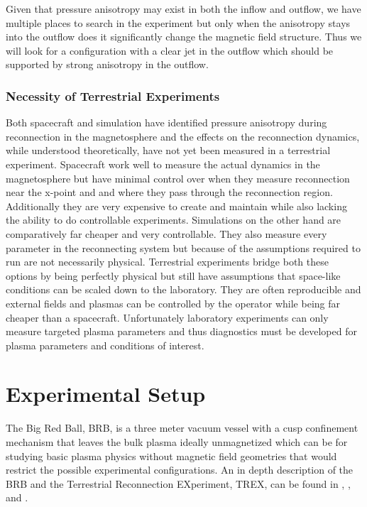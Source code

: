 Given that pressure anisotropy may exist in both the inflow and outflow, we have multiple places to search in the experiment but only when the anisotropy stays into the outflow does it significantly change the magnetic field structure. Thus we will look for a configuration with a clear jet in the outflow which should be supported by strong anisotropy in the outflow.

\subsubsection{Necessity of Terrestrial Experiments}

Both spacecraft and simulation have identified pressure anisotropy during reconnection in the magnetosphere and the effects on the reconnection dynamics, while understood theoretically, have not yet been measured in a terrestrial experiment. Spacecraft work well to measure the actual dynamics in the magnetosphere but have minimal control over when they measure reconnection near the x-point and and where they pass through the reconnection region. Additionally they are very expensive to create and maintain while also lacking the ability to do controllable experiments. Simulations on the other hand are comparatively far cheaper and very controllable. They also measure every parameter in the reconnecting system but because of the assumptions required to run are not necessarily physical. Terrestrial experiments bridge both these options by being perfectly physical but still have assumptions that space-like conditions can be scaled down to the laboratory. They are often reproducible and external fields and plasmas can be controlled by the operator while being far cheaper than a spacecraft. Unfortunately laboratory experiments can only measure targeted plasma parameters and thus diagnostics must be developed for plasma parameters and conditions of interest.

\section{Experimental Setup}

The Big Red Ball, BRB, is a three meter vacuum vessel with a cusp confinement mechanism that leaves the bulk plasma ideally unmagnetized which can be for studying basic plasma physics without magnetic field geometries that would restrict the possible experimental configurations. An in depth description of the BRB and the Terrestrial Reconnection EXperiment, TREX, can be found in \cite{Olson_2020}, \cite{Gradney_2025}, and \cite{Greess}.%

